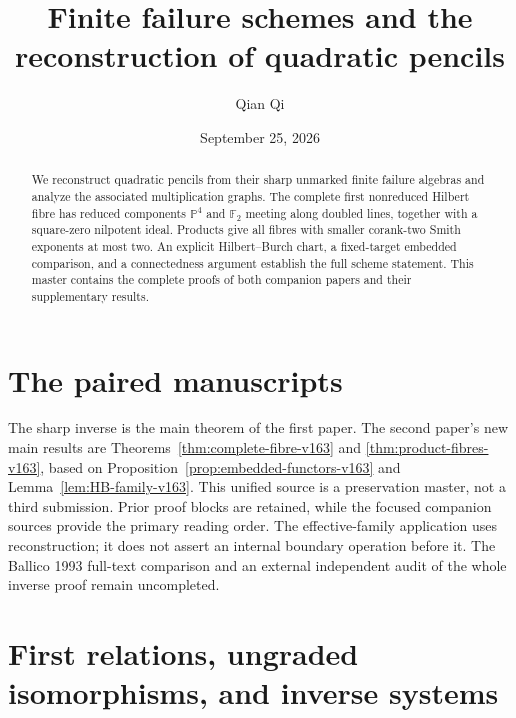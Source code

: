 \documentclass[11pt,reqno]{amsart}
\numberwithin{equation}{section}
\theoremstyle{definition}\newtheorem{definition}[theorem]{Definition}
\theoremstyle{remark}\newtheorem{remark}[theorem]{Remark}
\newcommand{\Pj}{\mathbb P}\newcommand{\A}{\mathbb A}
\begin{document}
\title[Finite failure schemes and quadratic pencils]{Finite failure schemes and the reconstruction of quadratic pencils}
\author{Qian Qi}
\date{September 25, 2026}
\begin{abstract}
We reconstruct quadratic pencils from their sharp unmarked finite
failure algebras and analyze the associated multiplication graphs.
The complete first nonreduced Hilbert fibre has reduced components
$\Pj^4$ and $\mathbb F_2$ meeting along doubled lines, together with
a square-zero nilpotent ideal. Products give all fibres with smaller
corank-two Smith exponents at most two. An explicit Hilbert--Burch
chart, a fixed-target embedded comparison, and a connectedness
argument establish the full scheme statement. This master contains
the complete proofs of both companion papers and their supplementary
results.
\end{abstract}
\maketitle
\section*{The paired manuscripts}
\label{sec:introduction-v153}
The sharp inverse is the main theorem of the first paper. The second
paper's new main results are
Theorems~\ref{thm:complete-fibre-v163} and
\ref{thm:product-fibres-v163}, based on
Proposition~\ref{prop:embedded-functors-v163} and
Lemma~\ref{lem:HB-family-v163}. This unified source is a preservation
master, not a third submission. Prior proof blocks are retained,
while the focused companion sources provide the primary reading order.
The effective-family application uses reconstruction; it does not
assert an internal boundary operation before it. The Ballico 1993
full-text comparison and an external independent audit of the whole
inverse proof remain uncompleted.

\section{First relations, ungraded isomorphisms, and inverse systems}
\label{sec:first-relations-v147}
\end{document}
